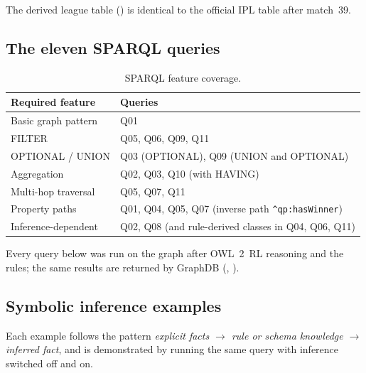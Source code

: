 The derived league table () is identical to the official IPL table after match~39.

\begin{table}[H]\centering

\caption{League positions derived by rules R1--R7 (query Q04).}\label{tab:standings}
\end{table}

\subsection{The eleven SPARQL queries}
\begin{table}[H]\centering\small
\begin{tabular}{p{4.2cm}p{10.6cm}}
\toprule
\textbf{Required feature} & \textbf{Queries} \\ \midrule
Basic graph pattern & Q01 \\
FILTER & Q05, Q06, Q09, Q11 \\
OPTIONAL / UNION & Q03 (OPTIONAL), Q09 (UNION and OPTIONAL) \\
Aggregation & Q02, Q03, Q10 (with HAVING) \\
Multi-hop traversal & Q05, Q07, Q11 \\
Property paths & Q01, Q04, Q05, Q07 (inverse path \texttt{\^{}qp:hasWinner}) \\
Inference-dependent & Q02, Q08 (and rule-derived classes in Q04, Q06, Q11) \\
\bottomrule
\end{tabular}
\caption{SPARQL feature coverage.}
\end{table}

Every query below was run on the graph after OWL~2~RL reasoning and the rules; the same results are returned by
GraphDB (, ).




\subsection{Symbolic inference examples}
Each example follows the pattern \emph{explicit facts $\rightarrow$ rule or schema knowledge $\rightarrow$
inferred fact}, and is demonstrated by running the same query with inference switched off and on.

